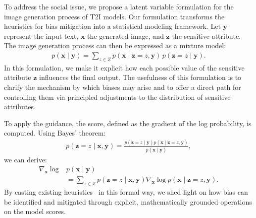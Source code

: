 To address the social issue, we propose a latent variable formulation for the image generation process of T2I models.
Our formulation transforms the heuristics for bias mitigation into a statistical modeling framework.
Let $\mathbf{y}$ represent the input text, $\mathbf{x}$ the generated image, and $\mathbf{z}$ the sensitive attribute. The image generation process can then be expressed as a mixture model:
\begin{align}
p(\mathbf{x} \mid \mathbf{y}) = \sum_{z\in Z} p(\mathbf{x} \mid \mathbf{z}=z, \mathbf{y}) \, p(\mathbf{z}=z \mid \mathbf{y}).
\end{align}
In this formulation, we make it explicit how each possible value of the sensitive attribute $\mathbf{z}$ influences the final output. The usefulness of this formulation is to clarify the mechanism by which biases may arise and to offer a direct path for controlling them via principled adjustments to the distribution of sensitive attributes.

To apply the guidance, the score, defined as the gradient of the log probability, is computed. Using Bayes' theorem:
\begin{align}
    p(\mathbf{z}=z \mid \mathbf{x}, \mathbf{y}) = \frac{p(\mathbf{z}=z \mid \mathbf{y})p(\mathbf{x}\mid \mathbf{z}=z, \mathbf{y})}{p(\mathbf{x}\mid \mathbf{y})},
\end{align}
we can derive:
\begin{align}
    \nonumber
    \nabla_{\mathbf{x}} \log &p(\mathbf{x}\mid \mathbf{y}) \\
    &= \sum_{z\in Z} p(\mathbf{z}=z \mid \mathbf{x}, \mathbf{y}) \nabla_{\mathbf{x}}\log p(\mathbf{x}\mid \mathbf{z}=z, \mathbf{y}).
\end{align}
By casting existing heuristics~\cite{friedrich2023fair} in this formal way, we shed light on how bias can be identified and mitigated through explicit, mathematically grounded operations on the model scores.

